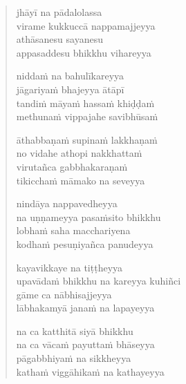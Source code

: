 \clearpage
\begin{verse}

jhāyī na pādalolassa\\
virame kukkuccā nappamajjeyya\\
athāsanesu sayanesu\\
appasaddesu bhikkhu vihareyya

niddaṁ na bahulīkareyya\\
jāgariyaṁ bhajeyya ātāpī\\
tandiṁ māyaṁ hassaṁ khiḍḍaṁ\\
methunaṁ vippajahe savibhūsaṁ

āthabbaṇaṁ supinaṁ lakkhaṇaṁ\\
no vidahe athopi nakkhattaṁ\\
virutañca gabbhakaraṇaṁ\\
tikicchaṁ māmako na seveyya

nindāya nappavedheyya\\
na uṇṇameyya pasaṁsito bhikkhu\\
lobhaṁ saha macchariyena\\
kodhaṁ pesuṇiyañca panudeyya

kayavikkaye na tiṭṭheyya\\
upavādaṁ bhikkhu na kareyya kuhiñci\\
gāme ca nābhisajjeyya\\
lābhakamyā janaṁ na lapayeyya

na ca katthitā siyā bhikkhu\\
na ca vācaṁ payuttaṁ bhāseyya\\
pāgabbhiyaṁ na sikkheyya\\
kathaṁ viggāhikaṁ na kathayeyya

\end{verse}


